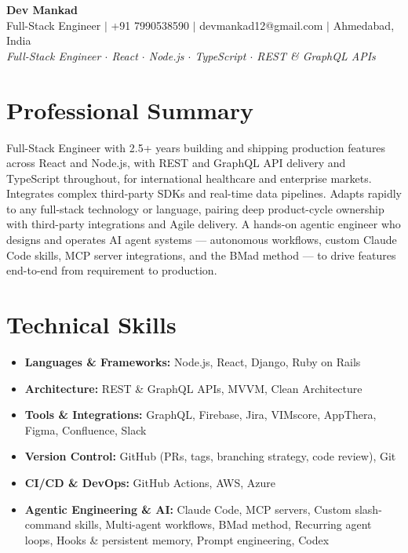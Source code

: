 \documentclass[a4paper,10pt]{article}
\begin{document}
\begin{center}
{\LARGE\bfseries Dev Mankad}\\[3pt]
{\small Full-Stack Engineer $\mid$ +91 7990538590 $\mid$ devmankad12@gmail.com $\mid$ Ahmedabad, India}\\[2pt]
{\small\itshape Full-Stack Engineer $\cdot$ React $\cdot$ Node.js $\cdot$ TypeScript $\cdot$ REST \& GraphQL APIs}
\end{center}
\vspace{2pt}
\section*{Professional Summary}
Full-Stack Engineer with 2.5+ years building and shipping production features across React and Node.js, with REST and GraphQL API delivery and TypeScript throughout, for international healthcare and enterprise markets. Integrates complex third-party SDKs and real-time data pipelines. Adapts rapidly to any full-stack technology or language, pairing deep product-cycle ownership with third-party integrations and Agile delivery. A hands-on agentic engineer who designs and operates AI agent systems --- autonomous workflows, custom Claude Code skills, MCP server integrations, and the BMad method --- to drive features end-to-end from requirement to production.
\section*{Technical Skills}
\begin{itemize}
  \item \textbf{Languages \& Frameworks:} Node.js, React, Django, Ruby on Rails
  \item \textbf{Architecture:} REST \& GraphQL APIs, MVVM, Clean Architecture
  \item \textbf{Tools \& Integrations:} GraphQL, Firebase, Jira, VIMscore, AppThera, Figma, Confluence, Slack
  \item \textbf{Version Control:} GitHub (PRs, tags, branching strategy, code review), Git
  \item \textbf{CI/CD \& DevOps:} GitHub Actions, AWS, Azure
  \item \textbf{Agentic Engineering \& AI:} Claude Code, MCP servers, Custom slash-command skills, Multi-agent workflows, BMad method, Recurring agent loops, Hooks \& persistent memory, Prompt engineering, Codex
\end{itemize}
\end{document}
